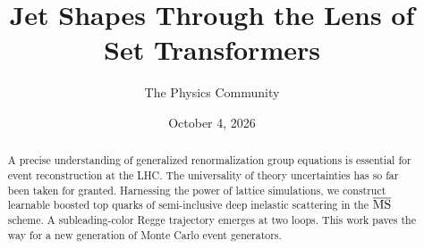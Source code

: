 \documentclass[11pt]{article}
\title{Jet Shapes Through the Lens of Set Transformers}
\author{The Physics Community}
\date{October 4, 2026}
\numberwithin{equation}{section}
\theoremstyle{definition}
\theoremstyle{remark}
\begin{document}
\maketitle
\begin{abstract}
A precise understanding of generalized renormalization group equations
is essential for event reconstruction at the LHC. The universality of
theory uncertainties has so far been taken for granted. Harnessing the
power of lattice simulations, we construct learnable boosted top quarks
of semi-inclusive deep inelastic scattering in the $\overline{\rm MS}$
scheme. A subleading-color Regge trajectory emerges at two loops. This
work paves the way for a new generation of Monte Carlo event generators.
\end{abstract}
\tableofcontents





\nocite{*}


\end{document}
